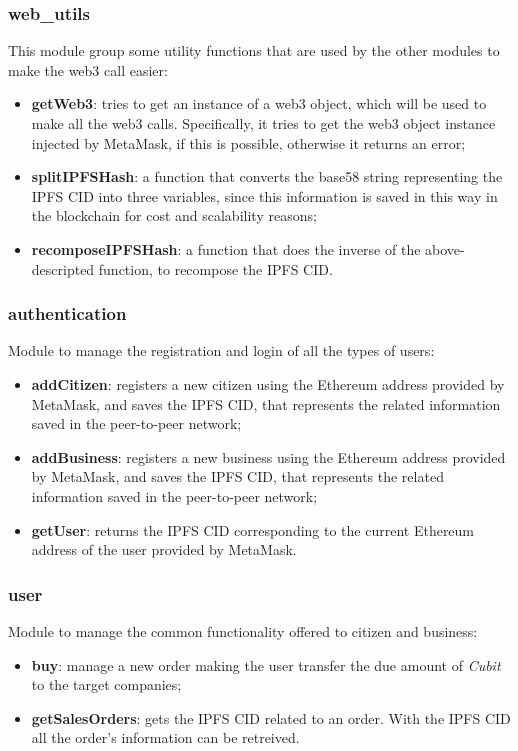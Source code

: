 \subsubsection{web\_utils}
This module group some utility functions that are used by the other modules to make the web3 call easier:
\begin{itemize}
	\item \textbf{getWeb3}: tries to get an instance of a web3 object, which will be used to make all the web3 calls. Specifically, it tries to get the web3 object instance injected by MetaMask, if this is possible, otherwise it returns an error;
	\item \textbf{splitIPFSHash}: a function that converts the base58 string representing the IPFS CID into three variables, since this information is saved in this way in the blockchain for cost and scalability reasons;
	\item \textbf{recomposeIPFSHash}: a function that does the inverse of the above-descripted function, to recompose the IPFS CID.
\end{itemize} 

\subsubsection{authentication}
Module to manage the registration and login of all the types of users:
\begin{itemize}
	\item \textbf{addCitizen}: registers a new citizen using the Ethereum address provided by MetaMask, and saves the IPFS CID, that represents the related information saved in the peer-to-peer network;
	\item \textbf{addBusiness}: registers a new business using the Ethereum address provided by MetaMask, and saves the IPFS CID, that represents the related information saved in the peer-to-peer network;
	\item \textbf{getUser}: returns the IPFS CID corresponding to the current Ethereum address of the user provided by MetaMask.
\end{itemize}
\subsubsection{user}
Module to manage the common functionality offered to citizen and business:
\begin{itemize}
	\item \textbf{buy}: manage a new order making the user transfer the due amount of \textit{Cubit} to the target companies;
	\item \textbf{getSalesOrders}: gets the IPFS CID related to an order. With the IPFS CID all the order's information can be retreived.
\end{itemize}

